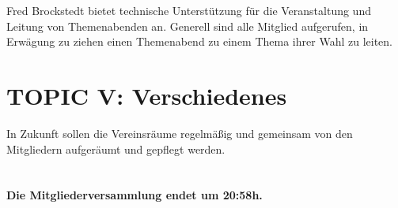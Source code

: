 \documentclass[11pt,a4paper,ngerman]{article}
\begin{document}
Fred Brockstedt bietet technische Unterstützung für die Veranstaltung und 
Leitung von Themenabenden an. Generell sind alle Mitglied aufgerufen, in 
Erwägung zu ziehen einen Themenabend zu einem Thema ihrer Wahl zu leiten.



\section{TOPIC V: Verschiedenes}


In Zukunft sollen die Vereinsräume regelmäßig und gemeinsam von den 
Mitgliedern aufgeräumt und gepflegt werden.\\
\\
\\
\textbf{Die Mitgliederversammlung endet um 20:58h.}
\end{document}

